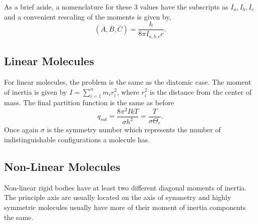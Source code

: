 As a brief aside, a nomenclature for these 3 values have the subscripts as $I_a,
I_b, I_c$ and a convenient rescaling of the moments is given by,
\begin{equation*}
	{(\overline{A},\overline{B},\overline{C})} = \frac{h}{8\pi I_{a,b,c} c}.
\end{equation*}

\subsection{Linear Molecules}
For linear molecules, the problem is the same as the diatomic case. The moment
of inertia is given by $I = \sum_{i=1}^{n}{m_i r_i^2}$, where $r_{i}^2$ is the
distance from the center of mass. The final partition function is the same as
before
\begin{equation*}
	q_{rot} = \frac{8 \pi^2 IkT}{\sigma h^2} = \frac{T}{\sigma \Theta_r}.
\end{equation*}
Once again $\sigma$ is the symmetry number which represents the number of
indistinguishable configurations a molecule has.

\subsection{Non-Linear Molecules}
Non-linear rigid bodies have at least two different diagonal moments of
inertia. The principle axis are usually located on the axis of symmetry and
highly symmetric molecules usually have more of their moment of inertia
components the same.

